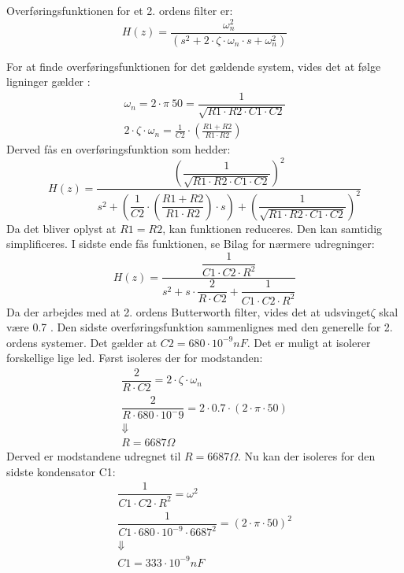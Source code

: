 Overføringsfunktionen for et 2. ordens filter er: 
\begin{equation}
H(z)=\frac{\omega_n^2}{(s^2 + 2\cdot\zeta \cdot \omega_n \cdot s+\omega_n^2)}
\end{equation}

For at finde overføringsfunktionen for det gældende system, vides det at følge ligninger gælder \cite{Wikilavpas}: 
\begin{equation}
\begin{split}
\omega_n = 2\cdot \pi\ 50 = \dfrac{1}{\sqrt{R1\cdot R2\cdot C1\cdot C2}}\\
2\cdot \zeta\cdot\omega_n =\frac{1}{C2}\cdot \left( \frac{R1+R2}{R1\cdot R2}\right)
\end{split}
\end{equation}
Derved fås en overføringsfunktion som hedder: 
\begin{equation}
H(z)=\frac{\left(\dfrac{1}{\sqrt{R1\cdot R2 \cdot C1\cdot C2}}\right)^2}{s^2+ \left( \dfrac{1}{C2} \cdot \left( \dfrac{R1+R2}{R1\cdot R2}\right) \cdot s \right) +\left( \dfrac{1}{\sqrt{R1\cdot R2 \cdot C1\cdot C2}}\right)^2 }
\end{equation}
Da det bliver oplyst at $ R1=R2 $, kan funktionen reduceres. Den kan samtidig simplificeres. I sidste ende fås funktionen, se Bilag for nærmere udregninger: 
\begin{equation}
H(z)=\dfrac{\dfrac{1}{C1 \cdot C2\cdot R^2}}{s^2+s\cdot \dfrac{2}{R\cdot C2}+ \dfrac{1}{C1\cdot C2\cdot R^2}}
\end{equation}
Da der arbejdes med at 2. ordens Butterworth filter, vides det at udsvinget$ \zeta $ skal være 0.7 \cite{ASB}. 
Den sidste overføringsfunktion sammenlignes med den generelle for 2. ordens systemer. Det gælder at $ C2 = 680\cdot 10^{-9} nF $. Det er muligt at isolerer forskellige lige led. Først isoleres der for modstanden: 
\begin{equation}
\begin{split}
\dfrac{2}{R\cdot C2}= 2\cdot \zeta \cdot \omega_n\\
\dfrac{2}{R\cdot 680\cdot 10^-9}=2\cdot 0.7 \cdot(2\cdot\pi\cdot 50)\\
\Downarrow\\
 R= 6687 \Omega
\end{split}
\end{equation}
Derved er modstandene udregnet til $ R = 6687\Omega $. Nu kan der isoleres for den sidste kondensator C1: 
\begin{equation}
\begin{split}
\dfrac{1}{C1\cdot C2\cdot R^2}= \omega^2\\
\dfrac{1}{C1\cdot 680\cdot 10^{-9}\cdot 6687^2}= (2\cdot \pi \cdot 50)^2\\
\Downarrow\\
C1=333\cdot 10^{-9} nF
\end{split}
\end{equation}

